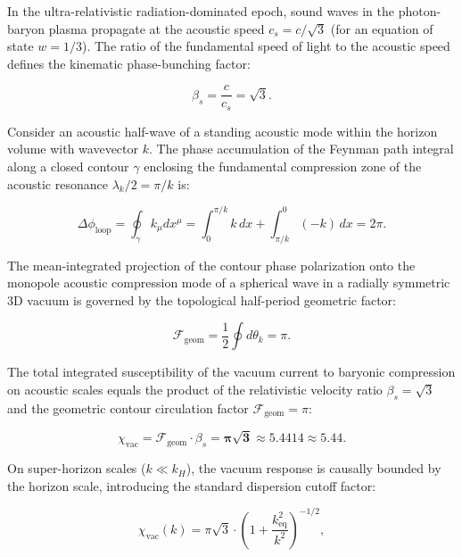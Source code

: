 In the ultra-relativistic radiation-dominated epoch, sound waves in the photon-baryon plasma propagate at the acoustic speed $c_s = c/\sqrt{3}$ (for an equation of state $w = 1/3$). The ratio of the fundamental speed of light to the acoustic speed defines the kinematic phase-bunching factor:

\begin{equation}\label{eq:4.48}\tag{4.48}
\beta_s = \frac{c}{c_s} = \sqrt{3}.
\end{equation}

Consider an acoustic half-wave of a standing acoustic mode within the horizon volume with wavevector $k$. The phase accumulation of the Feynman path integral along a closed contour $\gamma$ enclosing the fundamental compression zone of the acoustic resonance $\lambda_k / 2 = \pi / k$ is:

\begin{equation*}
\Delta \phi_{\text{loop}} = \oint_\gamma k_\mu dx^\mu = \int_0^{\pi/k} k \, dx + \int_{\pi/k}^0 (-k) \, dx = 2\pi.
\end{equation*}

The mean-integrated projection of the contour phase polarization onto the monopole acoustic compression mode of a spherical wave in a radially symmetric 3D vacuum is governed by the topological half-period geometric factor:

\begin{equation}\label{eq:4.49}\tag{4.49}
\mathcal{F}_{\text{geom}} = \frac{1}{2} \oint d\theta_k = \pi.
\end{equation}

The total integrated susceptibility of the vacuum current to baryonic compression on acoustic scales equals the product of the relativistic velocity ratio $\beta_s = \sqrt{3}$ and the geometric contour circulation factor $\mathcal{F}_{\text{geom}} = \pi$:

\begin{equation}\label{eq:4.50}\tag{4.50}
\chi_{\text{vac}} = \mathcal{F}_{\text{geom}} \cdot \beta_s = \mathbf{\pi \sqrt{3}} \approx \mathbf{5.4414} \approx \mathbf{5.44}.
\end{equation}

On super-horizon scales ($k \ll k_H$), the vacuum response is causally bounded by the horizon scale, introducing the standard dispersion cutoff factor:

\begin{equation}\label{eq:4.51}\tag{4.51}
\chi_{\text{vac}}(k) = \pi \sqrt{3} \cdot \left( 1 + \frac{k_{\text{eq}}^2}{k^2} \right)^{-1/2},
\end{equation}

